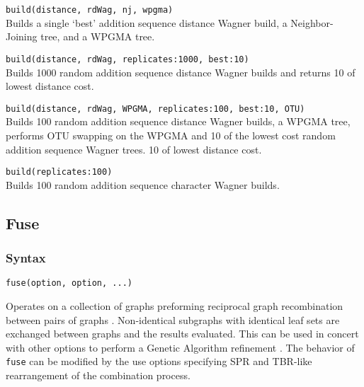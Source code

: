 	\begin{example}
	
		\item{\texttt{build(distance, rdWag, nj, wpgma)} \\ 
		Builds a single `best' addition sequence distance Wagner build, 
		a Neighbor-Joining tree, and a WPGMA tree.}
		
		\item{\texttt{build(distance, rdWag, replicates:1000, best:10)}\\
		Builds 1000 random addition sequence distance Wagner builds and returns 
		10 of lowest distance cost.}
	
		\item{\texttt{build(distance, rdWag, WPGMA, replicates:100, best:10, OTU)}\\
		Builds 100 random addition sequence distance Wagner builds, a WPGMA tree, 
		performs OTU swapping on the WPGMA and 10 of the lowest cost random addition 
		sequence Wagner trees. 
		10 of lowest distance cost.}
	
		\item{\texttt{build(replicates:100)} \\
		Builds 100 random addition sequence character Wagner builds.}

	\end{example}

\subsection{Fuse}
	\subsubsection{Syntax}
		\texttt{fuse(option, option, ...)}
		
	\begin{phygdescription}
		{Operates on a collection of graphs preforming reciprocal graph recombination between pairs of 
		graphs \citep{moilanen1999, moilanen2001, goloboff1999}. Non-identical subgraphs with identical 
		leaf sets are exchanged between graphs and the results evaluated. This can be used in concert 
		with other options to perform a Genetic Algorithm refinement \citep{Holland1975}. The behavior of 
		\texttt{fuse} can be modified by the use options specifying SPR and TBR-like rearrangement of the 
		combination process.}
	\end{phygdescription}
	
